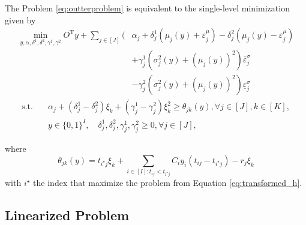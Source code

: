 \documentclass{beamer}
\newcommand{\T}{\mathrm{T}}
\begin{document}
\begin{frame}[allowframebreaks]
	\framebreak
	\begin{theorem}
		The Problem \ref{eq:outterproblem} is equivalent to the single-level minimization given by
		\begin{align*}
			\min_{y, \alpha, \delta^1, \delta^2, \gamma^1, \gamma^2} O^\T y + \sum_{j \in [J]} \Bigg( &\alpha_j + \delta_j^1 \left(\mu_j(y) + \varepsilon_j^\mu\right) - \delta_j^2 \left(\mu_j(y) - \varepsilon_j^\mu\right) \\
			& + \gamma_j^1 \left(\sigma_j^2(y) + (\mu_j(y))^2\right)\overline{\varepsilon}_j^\sigma \\
			& - \gamma_j^2 \left(\sigma_j^2(y) + (\mu_j(y))^2\right)\underline{\varepsilon}_j^\sigma
		\end{align*}
		\begin{align*}
			\text{s.t.}\quad &\alpha_j + (\delta_j^1 - \delta_j^2)\xi_k + (\gamma_j^1 - \gamma_j^2)\xi_k^2 \ge \theta_{jk}(y), \forall j \in [J], k \in [K], \\
			& y \in \{0, 1\}^I, \quad \delta_j^1, \delta_j^2, \gamma_j^1, \gamma_j^2 \ge 0, \forall j \in [J],
		\end{align*}
	\end{theorem}
	
	\framebreak
	\begin{theorem}
		where
		\begin{equation*}
			\theta_{jk}(y) = t_{i^\star j} \xi_k + \sum_{i \in [I]: t_{ij} < t_{i^\star j}} C_i y_i (t_{ij} - t_{i^\star j}) - r_j \xi_k
		\end{equation*}
		with $i^\star$ the index that maximize the problem from Equation \ref{eq:transformed_h}.
	\end{theorem}
\end{frame}

\subsection{Linearized Problem}
\begin{frame}
\end{frame}
\end{document}
